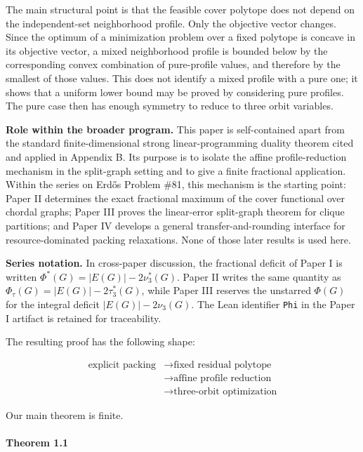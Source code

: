 \documentclass[
  american,
  11pt,
  a4paper,
]{article}
\begin{document}
The main structural point is that the feasible cover polytope does not depend on the independent-set neighborhood profile. Only the objective vector changes. Since the optimum of a minimization problem over a fixed polytope is concave in its objective vector, a mixed neighborhood profile is bounded below by the corresponding convex combination of pure-profile values, and therefore by the smallest of those values. This does not identify a mixed profile with a pure one; it shows that a uniform lower bound may be proved by considering pure profiles. The pure case then has enough symmetry to reduce to three orbit variables.

\textbf{Role within the broader program.} This paper is self-contained apart from the standard finite-dimensional strong linear-programming duality theorem cited and applied in Appendix B. Its purpose is to isolate the affine profile-reduction mechanism in the split-graph setting and to give a finite fractional application. Within the series on Erdős Problem \#81, this mechanism is the starting point: Paper II determines the exact fractional maximum of the cover functional over chordal graphs; Paper III proves the linear-error split-graph theorem for clique partitions; and Paper IV develops a general transfer-and-rounding interface for resource-dominated packing relaxations. None of those later results is used here.

\textbf{Series notation.} In cross-paper discussion, the fractional deficit of Paper I is written \(\Phi^*(G)=|E(G)|-2\nu_3^*(G)\). Paper II writes the same quantity as \(\Phi_\tau(G)=|E(G)|-2\tau_3^*(G)\), while Paper III reserves the unstarred \(\Phi(G)\) for the integral deficit \(|E(G)|-2\nu_3(G)\). The Lean identifier \texttt{Phi} in the Paper I artifact is retained for traceability.

The resulting proof has the following shape:

\[
\begin{aligned}
\text{explicit packing}
&\longrightarrow
\text{fixed residual polytope}\\
&\longrightarrow
\text{affine profile reduction}\\
&\longrightarrow
\text{three-orbit optimization}
\end{aligned}
\]

Our main theorem is finite.

\paragraph{Theorem 1.1}\label{theorem-1.1}
\end{document}
